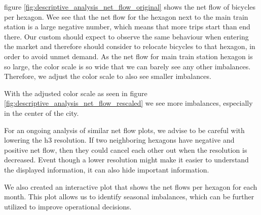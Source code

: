 figure \ref{fig:descriptive_analysis_net_flow_original} shows the net flow of
bicycles per hexagon. Wee see that the net flow for the hexagon next to the
main train station is a large negative number, which means that more trips
start than end there. Our custom should expect to observe the same behaviour
when entering the market and therefore should consider to relocate bicycles
to that hexagon, in order to avoid unmet demand.
As the net flow for main train station hexagon is so large, the color scale is
so wide that we can barely see any other imbalances.
Therefore, we adjust the color scale to also see smaller imbalances.

With the adjusted color scale as seen in figure
\ref{fig:descriptive_analysis_net_flow_rescaled} we see more imbalances,
especially in the center of the city.

For an ongoing analysis of similar net flow plots, we advise to be careful with lowering the h3 resolution.
If two neighboring hexagons have negative and positive net flow, then they could cancel each other out when the resolution is decreased.
Event though a lower resolution might make it easier to understand the displayed information, it can also hide important information.

We also created an interactive plot that shows the net flows per hexagon for each month.
This plot allows us to identify seasonal imbalances, which can be further utilized to improve operational decisions.

